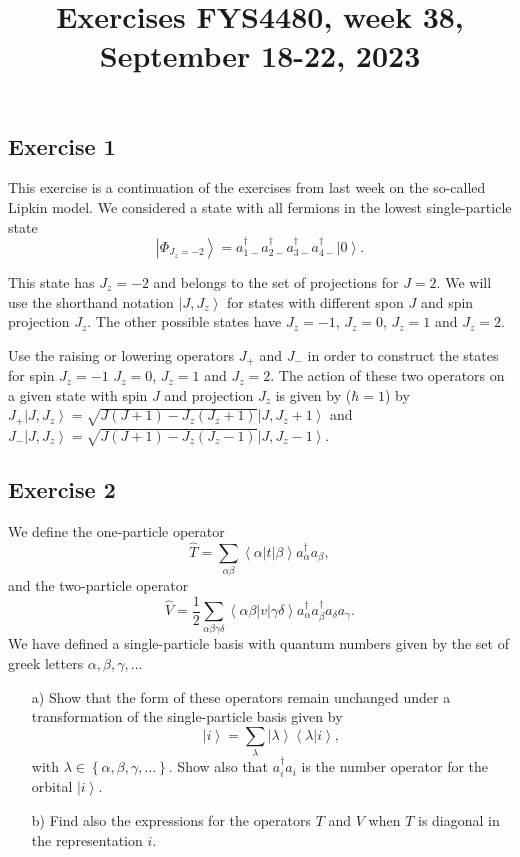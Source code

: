 \documentclass[prc]{revtex4}
\newcommand{\bra}[1]{\left\langle #1 \right|}
\newcommand{\ket}[1]{\left| #1 \right\rangle}
\begin{document}
\title{Exercises FYS4480, week 38, September 18-22, 2023}
\maketitle




\subsection*{Exercise 1}

This exercise is a continuation of the exercises from last week on the so-called Lipkin model.
We considered
a state with all fermions in the lowest
single-particle state
\[
\ket{\Phi_{J_z=-2}} =a_{1-}^{\dagger}a_{2-}^{\dagger}
a_{3-}^{\dagger}a_{4-}^{\dagger}\ket{0}.
\]

This state has $J_{z}=-2$ and belongs to the set of projections for
$J=2$.  We will use the shorthand notation $\ket{J,J_z}$ for states
with different spon $J$ and spin projection $J_z$.  The other possible
states have $J_{z}=-1$, $J_{z}=0$, $J_{z}=1$ and $J_{z}=2$.

Use the raising or lowering operators $J_{+}$ and $J_{-}$  in order to construct the 
states for spin $J_{z}=-1$ $J_{z}=0$, $J_{z}=1$
and $J_{z}=2$.
The action of these two operators on a given state with spin $J$ and projection $J_z$
is given by ($\hbar = 1$) by
$J_+\ket{J,J_z}=\sqrt{J(J+1)-J_z(J_z+1)}\ket{J,J_z+1}$ and
$J_-\ket{J,J_z}=\sqrt{J(J+1)-J_z(J_z-1)}\ket{J,J_z-1}$.

\subsection*{Exercise 2}
We define the one-particle operator
\[
\hat{T}={\displaystyle
\sum_{\alpha\beta}}\bra{\alpha}t\ket{\beta}a_{\alpha}^
{\dagger}a_{\beta},
\]
and the two-particle operator
\[
\hat{V}=
\frac{1}{2}{\displaystyle
\sum_{\alpha\beta\gamma\delta}}\bra{\alpha\beta}
v\ket{\gamma\delta}a_{\alpha}^{\dagger}a_{\beta}^{\dagger}
a_{\delta}a_{\gamma}.
\]
We have defined a single-particle basis with quantum numbers given by the set of greek letters $\alpha,\beta,\gamma,\dots$

\begin{enumerate}
\item[a)] Show that the form of these operators remain unchanged under 
a transformation  of the single-particle basis given by 
\[
\ket{i}=\sum_{\lambda}\ket{\lambda}\left\langle \lambda | i \right\rangle,
\]
with $\lambda\in \left\{\alpha,\beta,\gamma,\dots\right\}$. 
Show also that
$a_{i}^{\dagger}a_{i}$ is the number operator
for  the orbital $\ket{i}$. 
\item[b)] Find also the expressions for the operators
$T$ and $V$ when $T$ is diagonal in the representation
$i$. 
\end{enumerate}
\end{document}
